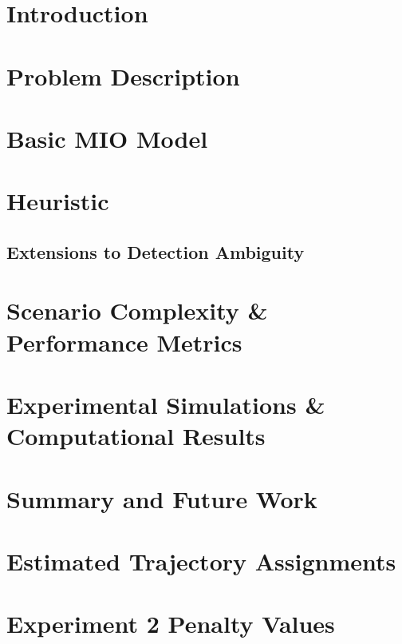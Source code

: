 \documentclass[12pt,twoside,leftblank]{mitthesis}
\begin{document}

\pagestyle{plain}


\chapter{Introduction}\label{ch: Intro}


\chapter{Problem Description}\label{ch:Problem Description}


\chapter{Basic MIO Model}\label{ch:Basic MIO Model}


\chapter{Heuristic} \label{ch:Heuristic}


\section{Extensions to Detection Ambiguity}\label{sec:Robust MIO Model}


\chapter{Scenario Complexity \& Performance Metrics} \label{ch:Scenario-Performance}

 
\chapter{Experimental Simulations \& Computational Results}\label{ch:Results}


\chapter{Summary and Future Work}\label{ch:Conclusion}


\appendix

\chapter{Estimated Trajectory Assignments}\label{ch:Assignment_Appendix}


\chapter{Experiment 2 Penalty Values}\label{ch:Penalty_Appendix}



\end{document}
